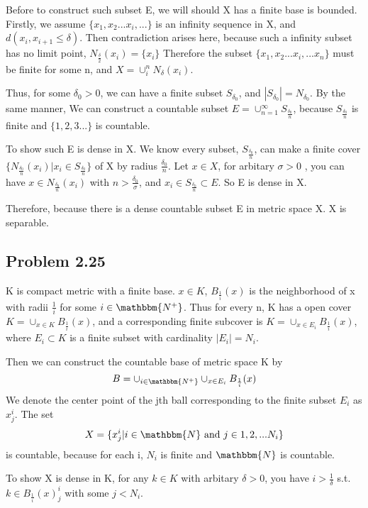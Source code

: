 \documentclass{article}
\begin{document}
Before to construct such subset E, we will should X  has a finite base is bounded.
Firstly, we assume $\{ x_1, x_2 ... x_i, ... \}$ is an infinity sequence in X, and $d(x_i, x_{i+1} \leq \delta)$.
Then contradiction arises here, because such a infinity subset has no limit point, $N_{\frac{\delta}{2}} (x_i) = \{x_i\}$
Therefore the subset $\{ x_1, x_2 ... x_i, ... x_n \}$  must be finite for some n, and $ X = \cup^{n}_i N_{\delta} (x_i)$.

Thus, for some $\delta_0 > 0$, we can have a finite subset $S_{\delta_0}$, and $ |S_{\delta_0}| = N_{\delta_0} $.
By the same manner, We can construct a countable subset $ E = \cup_{n=1}^{\infty} S_{\frac{\delta_0}{n}}$, because $S_{\frac{\delta_0}{n}}$ is finite and $\{ 1, 2,3...\}$ is countable.

To show such E is dense in X. We know every subset, $S_{\frac{\delta_0}{n}}$, can make a finite cover $ \{ N_{\frac{\delta_0}{n}}(x_i) | x_i \in S_{\frac{\delta_0}{n}} \} $ of X by radius $\frac{\delta_0}{n}$.
Let $x\in X$, for arbitary $\sigma >0$ , you can have $ x \in N_{\frac{\delta_0}{n}} (x_i) $ with $ n > \frac{\delta_0}{\sigma}$, and $x_i \in  S_{\frac{\delta_0}{n}} \subset E$.
So E is dense in X.

Therefore, because there is a dense countable subset E in metric space X. X is separable.


\subsection*{Problem 2.25}
K is compact metric with a finite base. $x \in K$, $B_{\frac{1}{i}}(x)$ is the neighborhood of x with radii $\frac{1}{i}$ for some $i \in \mathbbm{N^+}$.
Thus for every  n, K has a open cover $K = \cup_{x \in  K} B_{\frac{1}{i}}(x) $, and a corresponding finite subcover is $K = \cup_{x \in E_{i}} B_{\frac{1}{i}}(x) $,
where $E_i \subset K$ is a finite subset with cardinality $|E_i| = N_i$.

Then we can construct the countable base of metric space K by $$B = \cup_{i \in \mathbbm{N^+}} \cup_{x \in E_{i}} B_{\frac{1}{i}}(x)$$
We denote the center point of the jth ball corresponding to the finite subset $E_i$ as $ x^i_j$.
The set $$ X = \{x^i_j | i \in \mathbbm{N} \text{ and } j \in {1, 2, ... N_i}\}$$ is countable, because for each i, $N_i$ is finite and $\mathbbm{N}$ is countable.

To show X is dense in K, for any $k \in K$ with arbitary $ \delta > 0$, you have $i > \frac{1}{\delta}$ s.t. $ k \in B_{\frac{1}{i}}(x)^i_j$ with some $j < N_i$.
\end{document}
